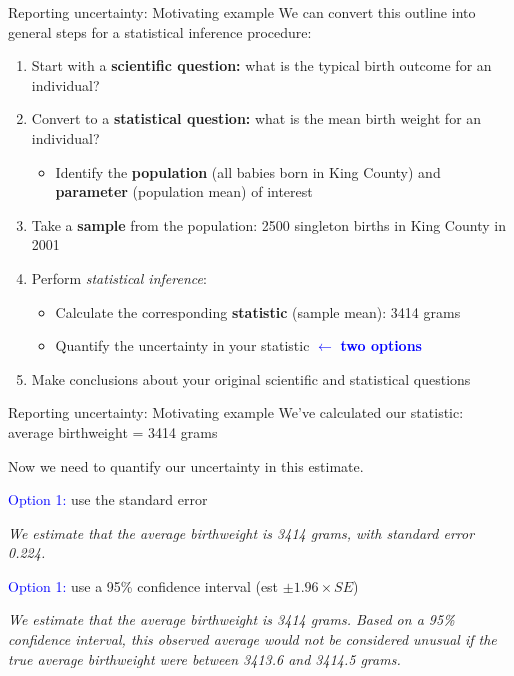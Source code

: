 \documentclass[10pt,t]{beamer}
\begin{document}
\begin{frame}{Reporting uncertainty: Motivating example}
We can convert this outline into general steps for a statistical inference procedure:

\vspace{0.3cm}

\begin{enumerate}
	\item Start with a \textbf{scientific question:} what is the typical birth outcome for an individual?
	\item Convert to a \textbf{statistical question:} what is the mean birth weight for an individual?
	\begin{itemize}
		\item Identify the \textbf{population} (all babies born in King County) and \textbf{parameter} (population mean) of interest
	\end{itemize}
	\item Take a \textbf{sample} from the population: 2500 singleton births in King County in 2001
	\item Perform \textit{statistical inference}:
	\begin{itemize}
		\item Calculate the corresponding \textbf{statistic} (sample mean): 3414 grams
		\item Quantify the uncertainty in your statistic \textcolor{blue}{$\leftarrow$ \textbf{two options}}
	\end{itemize}
	\item Make conclusions about your original scientific and statistical questions
\end{enumerate}
\end{frame}

\begin{frame}{Reporting uncertainty: Motivating example}
We've calculated our statistic: average birthweight = 3414 grams

\vspace{0.3cm}

Now we need to quantify our uncertainty in this estimate.

\vspace{0.3cm}

\textcolor{blue}{Option 1:} use the standard error

\textit{We estimate that the average birthweight is 3414 grams, with standard error 0.224.}

\vspace{0.3cm}

\textcolor{blue}{Option 1:} use a 95\% confidence interval (est $\pm 1.96 \times SE$)

\textit{We estimate that the average birthweight is 3414 grams. Based on a 95\% confidence interval, this observed average would not be considered unusual if the true average birthweight were between 3413.6 and  3414.5 grams.}

\end{frame}
\end{document}
